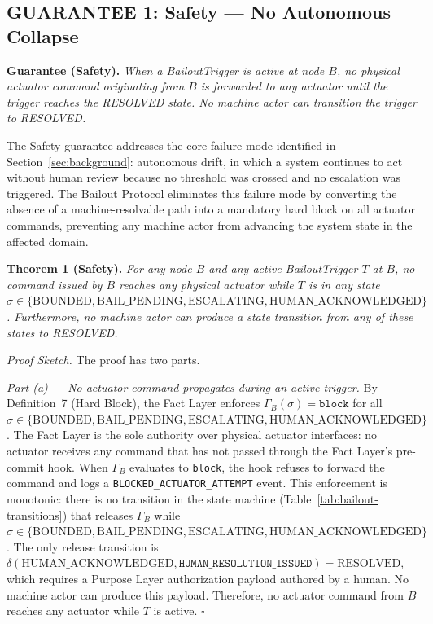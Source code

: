 \subsection{GUARANTEE 1: Safety — No Autonomous Collapse}
\label{sec:guarantee-safety}

\bigskip

\begin{minipage}{\textwidth}
\textbf{Guarantee (Safety).} \textit{When a BailoutTrigger is active at node $B$, no physical actuator command originating from $B$ is forwarded to any actuator until the trigger reaches the RESOLVED state. No machine actor can transition the trigger to RESOLVED.}
\end{minipage}

\bigskip

The Safety guarantee addresses the core failure mode identified in Section~\ref{sec:background}: autonomous drift, in which a system continues to act without human review because no threshold was crossed and no escalation was triggered. The Bailout Protocol eliminates this failure mode by converting the absence of a machine-resolvable path into a mandatory hard block on all actuator commands, preventing any machine actor from advancing the system state in the affected domain.

\bigskip

\noindent\textbf{Theorem 1 (Safety).}
\textit{For any node $B$ and any active BailoutTrigger $T$ at $B$, no command issued by $B$ reaches any physical actuator while $T$ is in any state $\sigma \in \{\text{BOUNDED}, \text{BAIL\_PENDING}, \text{ESCALATING}, \text{HUMAN\_ACKNOWLEDGED}\}$. Furthermore, no machine actor can produce a state transition from any of these states to RESOLVED.}

\bigskip

\noindent\textit{Proof Sketch.} The proof has two parts.

\bigskip

\noindent\textit{Part (a) — No actuator command propagates during an active trigger.} By Definition~7 (Hard Block), the Fact Layer enforces $\Gamma_B(\sigma) = \texttt{block}$ for all $\sigma \in \{\text{BOUNDED}, \text{BAIL\_PENDING}, \text{ESCALATING}, \text{HUMAN\_ACKNOWLEDGED}\}$. The Fact Layer is the sole authority over physical actuator interfaces: no actuator receives any command that has not passed through the Fact Layer's pre-commit hook. When $\Gamma_B$ evaluates to \texttt{block}, the hook refuses to forward the command and logs a \texttt{BLOCKED\_ACTUATOR\_ATTEMPT} event. This enforcement is monotonic: there is no transition in the state machine (Table~\ref{tab:bailout-transitions}) that releases $\Gamma_B$ while $\sigma \in \{\text{BOUNDED}, \text{BAIL\_PENDING}, \text{ESCALATING}, \text{HUMAN\_ACKNOWLEDGED}\}$. The only release transition is $\delta(\text{HUMAN\_ACKNOWLEDGED}, \texttt{HUMAN\_RESOLUTION\_ISSUED}) = \text{RESOLVED}$, which requires a Purpose Layer authorization payload authored by a human. No machine actor can produce this payload. Therefore, no actuator command from $B$ reaches any actuator while $T$ is active. $\square$


